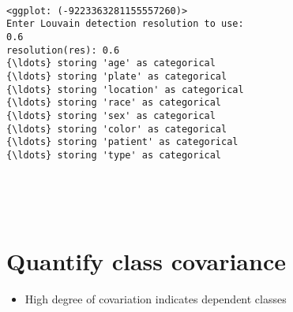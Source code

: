 \documentclass[11pt]{article}
\providecommand{\tightlist}{%
      \setlength{\itemsep}{0pt}\setlength{\parskip}{0pt}}
\begin{document}
    \begin{center}
    \end{center}
    { \hspace*{\fill} \\}
    
    \begin{Verbatim}[commandchars=\\\{\}]
<ggplot: (-9223363281155557260)>
Enter Louvain detection resolution to use:
0.6
resolution(res): 0.6
{\ldots} storing 'age' as categorical
{\ldots} storing 'plate' as categorical
{\ldots} storing 'location' as categorical
{\ldots} storing 'race' as categorical
{\ldots} storing 'sex' as categorical
{\ldots} storing 'color' as categorical
{\ldots} storing 'patient' as categorical
{\ldots} storing 'type' as categorical

    \end{Verbatim}

    \begin{center}
    \end{center}
    { \hspace*{\fill} \\}
    
    \begin{center}
    \end{center}
    { \hspace*{\fill} \\}
    
    \section{Quantify class covariance}\label{quantify-class-covariance}

\begin{itemize}
\tightlist
\item
  High degree of covariation indicates dependent classes
\end{itemize}
\end{document}
